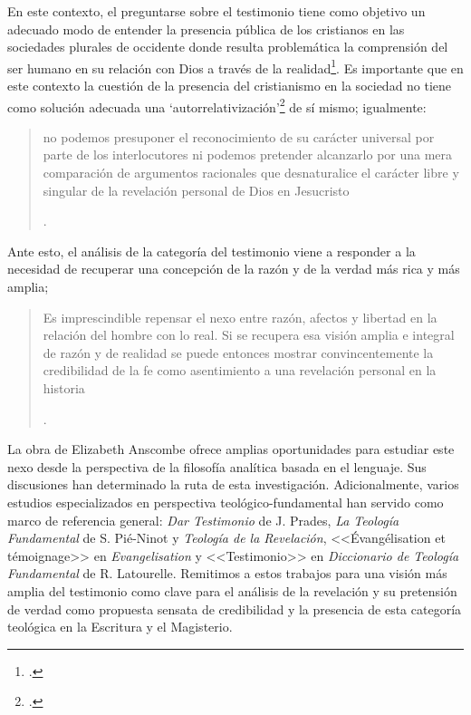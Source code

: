 En este contexto, el preguntarse sobre el testimonio tiene como objetivo un adecuado modo de entender la presencia pública de los cristianos en las sociedades plurales de occidente donde resulta problemática la comprensión del ser humano en su relación con Dios a través de la realidad\footcite[Cf.][75]{prades2015testimonio}. Es importante que en este contexto la cuestión de la presencia del cristianismo en la sociedad no tiene como solución adecuada una `autorrelativización'\footcite[Cf.][75;\,40-44]{prades2015testimonio} de sí mismo; igualmente: \blockquote[{\Cite[75; Cf. 33-40]{prades2015testimonio}}.]{no podemos presuponer el reconocimiento de su carácter universal por parte de los interlocutores ni podemos pretender alcanzarlo por una mera comparación de argumentos racionales que desnaturalice el carácter libre y singular de la revelación personal de Dios en Jesucristo}. Ante esto, el análisis de la categoría del testimonio viene a responder a la necesidad de recuperar una concepción de la razón y de la verdad más rica y más amplia; \blockquote[{\Cite[76]{prades2015testimonio}}.]{Es imprescindible repensar el nexo entre razón, afectos y libertad en la relación del hombre con lo real. Si se recupera esa visión amplia e integral de razón y de realidad se puede entonces mostrar convincentemente la credibilidad de la fe como asentimiento a una revelación personal en la historia}.

La obra de Elizabeth Anscombe ofrece amplias oportunidades para estudiar este nexo desde la perspectiva de la filosofía analítica basada en el lenguaje. Sus discusiones han determinado la ruta de esta investigación. Adicionalmente, varios estudios especializados en perspectiva teológico-fundamental han servido como marco de referencia general: \emph{Dar Testimonio} de J. Prades, \emph{La Teología Fundamental} de S. Pié-Ninot y \emph{Teología de la Revelación}, <<Évangélisation et témoignage>> en \emph{Evangelisation} y <<Testimonio>> en \emph{Diccionario de Teología Fundamental} de R. Latourelle. Remitimos a estos trabajos para una visión más amplia del testimonio como clave para el análisis de la revelación y su pretensión de verdad como propuesta sensata de credibilidad y la presencia de esta categoría teológica en la Escritura y el Magisterio.

